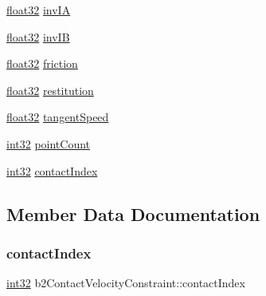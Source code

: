 \begin{DoxyCompactItemize}
\mbox{\hyperlink{b2_settings_8h_aacdc525d6f7bddb3ae95d5c311bd06a1}{float32}} \mbox{\hyperlink{structb2_contact_velocity_constraint_ac6c18706a9ee89c5a682dc610e86e00f}{inv\+IA}}
\item 
\mbox{\hyperlink{b2_settings_8h_aacdc525d6f7bddb3ae95d5c311bd06a1}{float32}} \mbox{\hyperlink{structb2_contact_velocity_constraint_aae02d4fd8f60353385b9cc876dc78a81}{inv\+IB}}
\item 
\mbox{\hyperlink{b2_settings_8h_aacdc525d6f7bddb3ae95d5c311bd06a1}{float32}} \mbox{\hyperlink{structb2_contact_velocity_constraint_a11025786ae828eeeb60dfcd15358d934}{friction}}
\item 
\mbox{\hyperlink{b2_settings_8h_aacdc525d6f7bddb3ae95d5c311bd06a1}{float32}} \mbox{\hyperlink{structb2_contact_velocity_constraint_a6734f74c1970abc64ed7dcffd8737257}{restitution}}
\item 
\mbox{\hyperlink{b2_settings_8h_aacdc525d6f7bddb3ae95d5c311bd06a1}{float32}} \mbox{\hyperlink{structb2_contact_velocity_constraint_aaf6acabb0ef62eeac647250e2520a272}{tangent\+Speed}}
\item 
\mbox{\hyperlink{b2_settings_8h_a43d43196463bde49cb067f5c20ab8481}{int32}} \mbox{\hyperlink{structb2_contact_velocity_constraint_a1decd7bf6a5dc61bd72d4e87b070a660}{point\+Count}}
\item 
\mbox{\hyperlink{b2_settings_8h_a43d43196463bde49cb067f5c20ab8481}{int32}} \mbox{\hyperlink{structb2_contact_velocity_constraint_a4c76b9292f28859e2f8c9d075e79b873}{contact\+Index}}
\end{DoxyCompactItemize}


\subsection{Member Data Documentation}
\mbox{\label{structb2_contact_velocity_constraint_a4c76b9292f28859e2f8c9d075e79b873}} 
\subsubsection{\texorpdfstring{contactIndex}{contactIndex}}
{\footnotesize\ttfamily \mbox{\hyperlink{b2_settings_8h_a43d43196463bde49cb067f5c20ab8481}{int32}} b2\+Contact\+Velocity\+Constraint\+::contact\+Index}

